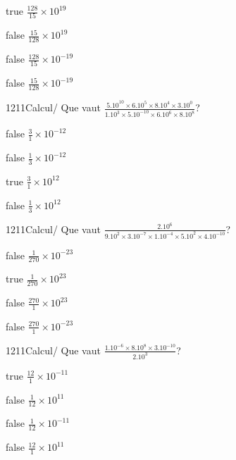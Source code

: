             \begin{reponses}
                \item[true] $\frac{128}{15}\times 10^{19}$
                \item[false] $\frac{15}{128}\times 10^{19}$
                \item[false] $\frac{128}{15}\times 10^{-19}$
                \item[false] $\frac{15}{128}\times 10^{-19}$
            \end{reponses}
            \begin{question}{1211}{Calcul}{}{/}
                Que vaut $\frac{5.10^{10}\times 6.10^{5}\times 8.10^{4}\times 3.10^{0}}{1.10^{3}\times 5.10^{-10}\times 6.10^{6}\times 8.10^{8}}$?
            \end{question}
            \begin{reponses}
                \item[false] $\frac{3}{1}\times 10^{-12}$
                \item[false] $\frac{1}{3}\times 10^{-12}$
                \item[true] $\frac{3}{1}\times 10^{12}$
                \item[false] $\frac{1}{3}\times 10^{12}$
            \end{reponses}
            \begin{question}{1211}{Calcul}{}{/}
                Que vaut $\frac{2.10^{6}}{9.10^{2}\times 3.10^{-7}\times 1.10^{-4}\times 5.10^{2}\times 4.10^{-10}}$?
            \end{question}
            \begin{reponses}
                \item[false] $\frac{1}{270}\times 10^{-23}$
                \item[true] $\frac{1}{270}\times 10^{23}$
                \item[false] $\frac{270}{1}\times 10^{23}$
                \item[false] $\frac{270}{1}\times 10^{-23}$
            \end{reponses}
            \begin{question}{1211}{Calcul}{}{/}
                Que vaut $\frac{1.10^{-6}\times 8.10^{8}\times 3.10^{-10}}{2.10^{3}}$?
            \end{question}
            \begin{reponses}
                \item[true] $\frac{12}{1}\times 10^{-11}$
                \item[false] $\frac{1}{12}\times 10^{11}$
                \item[false] $\frac{1}{12}\times 10^{-11}$
                \item[false] $\frac{12}{1}\times 10^{11}$
            \end{reponses}
